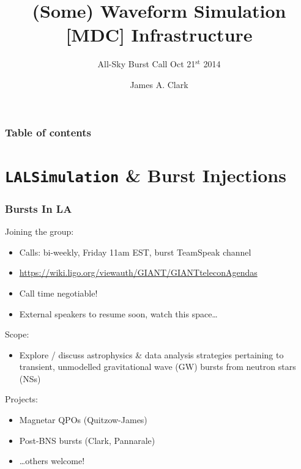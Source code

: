 \documentclass{beamer}
\def\gw#1{gravitational wave#1 (GW#1)\gdef\gw{GW}}
\def\ns#1{neutron star#1 (NS#1)\gdef\ns{NS}}
\begin{document}
\title{(Some) Waveform Simulation [MDC] Infrastructure}
\subtitle{All-Sky Burst Call Oct 21$^{\text{st}}$ 2014}  
\author{James A. Clark}
\date{} 

\begin{frame}[plain]
\titlepage
\end{frame}

\begin{frame}\frametitle{Table of contents}\tableofcontents
\end{frame} 

\section{{\tt LALSimulation} \& Burst Injections}

\begin{frame}
    \frametitle{Bursts In LA}
    Joining the group:
    \begin{itemize}
        \item Calls: bi-weekly, Friday 11am EST, burst TeamSpeak channel
        \item
            {\small\href{https://wiki.ligo.org/viewauth/GIANT/GIANTteleconAgendas}
            {https://wiki.ligo.org/viewauth/GIANT/GIANTteleconAgendas}}
        \item Call time negotiable!
        \item External speakers to resume soon, watch this space\dots
    \end{itemize}
    Scope:
    \begin{itemize}
        \item Explore / discuss astrophysics \& data analysis strategies
            pertaining to transient, unmodelled \gw{} bursts from \ns{s}
    \end{itemize}
    Projects:
    \begin{itemize}
        \item Magnetar QPOs (Quitzow-James)
        \item Post-BNS bursts (Clark, Pannarale)
        \item \dots others welcome!
    \end{itemize}
\end{frame}
\end{document}
